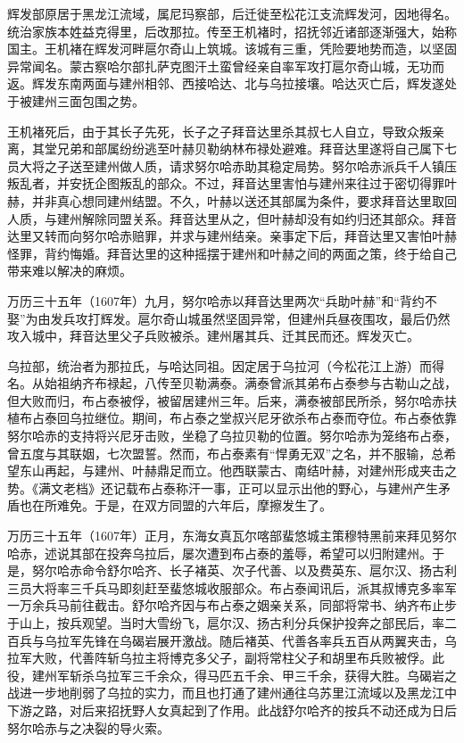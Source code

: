 辉发部原居于黑龙江流域，属尼玛察部，后迁徙至松花江支流辉发河，因地得名。统治家族本姓益克得里，后改那拉。传至王机褚时，招抚邻近诸部逐渐强大，始称国主。王机褚在辉发河畔扈尔奇山上筑城。该城有三重，凭险要地势而造，以坚固异常闻名。蒙古察哈尔部扎萨克图汗土蛮曾经亲自率军攻打扈尔奇山城，无功而返。辉发东南两面与建州相邻、西接哈达、北与乌拉接壤。哈达灭亡后，辉发遂处于被建州三面包围之势。

王机褚死后，由于其长子先死，长子之子拜音达里杀其叔七人自立，导致众叛亲离，其堂兄弟和部属纷纷逃至叶赫贝勒纳林布禄处避难。拜音达里遂将自己属下七员大将之子送至建州做人质，请求努尔哈赤助其稳定局势。努尔哈赤派兵千人镇压叛乱者，并安抚企图叛乱的部众。不过，拜音达里害怕与建州来往过于密切得罪叶赫，并非真心想同建州结盟。不久，叶赫以送还其部属为条件，要求拜音达里取回人质，与建州解除同盟关系。拜音达里从之，但叶赫却没有如约归还其部众。拜音达里又转而向努尔哈赤赔罪，并求与建州结亲。亲事定下后，拜音达里又害怕叶赫怪罪，背约悔婚。拜音达里的这种摇摆于建州和叶赫之间的两面之策，终于给自己带来难以解决的麻烦。

万历三十五年（1607年）九月，努尔哈赤以拜音达里两次“兵助叶赫”和“背约不娶”为由发兵攻打辉发。扈尔奇山城虽然坚固异常，但建州兵昼夜围攻，最后仍然攻入城中，拜音达里父子兵败被杀。建州屠其兵、迁其民而还。辉发灭亡。

乌拉部，统治者为那拉氏，与哈达同祖。因定居于乌拉河（今松花江上游）而得名。从始祖纳齐布禄起，八传至贝勒满泰。满泰曾派其弟布占泰参与古勒山之战，但大败而归，布占泰被俘，被留居建州三年。后来，满泰被部民所杀，努尔哈赤扶植布占泰回乌拉继位。期间，布占泰之堂叔兴尼牙欲杀布占泰而夺位。布占泰依靠努尔哈赤的支持将兴尼牙击败，坐稳了乌拉贝勒的位置。努尔哈赤为笼络布占泰，曾五度与其联姻，七次盟誓。然而，布占泰素有“悍勇无双”之名，并不服输，总希望东山再起，与建州、叶赫鼎足而立。他西联蒙古、南结叶赫，对建州形成夹击之势。《满文老档》还记载布占泰称汗一事，正可以显示出他的野心，与建州产生矛盾也在所难免。于是，在双方同盟的六年后，摩擦发生了。

万历三十五年（1607年）正月，东海女真瓦尔喀部蜚悠城主策穆特黑前来拜见努尔哈赤，述说其部在投奔乌拉后，屡次遭到布占泰的羞辱，希望可以归附建州。于是，努尔哈赤命令舒尔哈齐、长子褚英、次子代善、以及费英东、扈尔汉、扬古利三员大将率三千兵马即刻赶至蜚悠城收服部众。布占泰闻讯后，派其叔博克多率军一万余兵马前往截击。舒尔哈齐因与布占泰之姻亲关系，同部将常书、纳齐布止步于山上，按兵观望。当时大雪纷飞，扈尔汉、扬古利分兵保护投奔之部民后，率二百兵与乌拉军先锋在乌碣岩展开激战。随后褚英、代善各率兵五百从两翼夹击，乌拉军大败，代善阵斩乌拉主将博克多父子，副将常柱父子和胡里布兵败被俘。此役，建州军斩杀乌拉军三千余众，得马匹五千余、甲三千余，获得大胜。乌碣岩之战进一步地削弱了乌拉的实力，而且也打通了建州通往乌苏里江流域以及黑龙江中下游之路，对后来招抚野人女真起到了作用。此战舒尔哈齐的按兵不动还成为日后努尔哈赤与之决裂的导火索。

